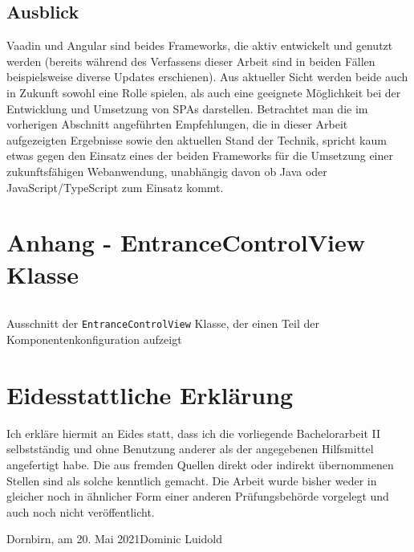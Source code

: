 \documentclass[a4paper,12pt,twoside]{scrreprt}
\begin{document}
\section{Ausblick}
\label{sec:ausblick}
Vaadin und Angular sind beides Frameworks, die aktiv entwickelt und genutzt werden (bereits während des Verfassens dieser Arbeit sind in beiden Fällen beispielsweise diverse Updates erschienen). Aus aktueller Sicht werden beide auch in Zukunft sowohl eine Rolle spielen, als auch eine geeignete Möglichkeit bei der Entwicklung und Umsetzung von \acp{SPA} darstellen. Betrachtet man die im vorherigen Abschnitt angeführten Empfehlungen, die in dieser Arbeit aufgezeigten Ergebnisse sowie den aktuellen Stand der Technik, spricht kaum etwas gegen den Einsatz eines der beiden Frameworks für die Umsetzung einer zukunftsfähigen Webanwendung, unabhängig davon ob Java oder JavaScript/TypeScript zum Einsatz kommt.

\clearpage
{}
{}
\printbibliography

\appendix

\chapter*{Anhang - EntranceControlView Klasse}
\label{appendix:entrance-control-view-class}
\begin{listing}[H]
    \inputminted[fontsize=\footnotesize,linenos,breaklines]{java}{code/Luidold_Results-Vaadin-Components-CodeSample.java}
    \caption[Ausschnitt der \texttt{EntranceControlView} Klasse, der einen Teil der Komponentenkonfiguration aufzeigt]{Ausschnitt der \texttt{EntranceControlView} Klasse, der einen Teil der Komponentenkonfiguration aufzeigt}
    \label{code:results-vaadin-components}
\end{listing}

\chapter*{Eidesstattliche Erklärung}
Ich erkläre hiermit an Eides statt, dass ich die vorliegende Bachelorarbeit II selbstständig und ohne Benutzung anderer als der angegebenen Hilfsmittel angefertigt habe. Die aus fremden Quellen direkt oder indirekt übernommenen Stellen sind als solche kenntlich gemacht. Die Arbeit wurde bisher weder in gleicher noch in ähnlicher Form einer anderen Prüfungsbehörde vorgelegt und auch noch nicht veröffentlicht.

\vspace{5cm}
\noindent
Dornbirn, am 20. Mai 2021\hfill Dominic Luidold
\end{document}
